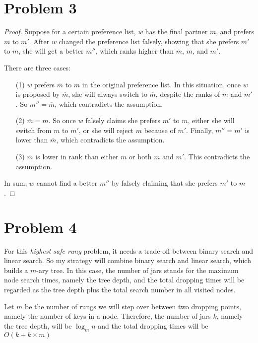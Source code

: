 \documentclass[12pt,letterpaper]{article}
\begin{document}
\section*{Problem 3}
\begin{proof}
Suppose for a certain preference list, $w$ has the final partner $\overline{m}$,
and prefers $m$ to $m'$. After $w$ changed the preference list falsely, 
showing that she prefers $m'$ to $m$, she will get a better $m''$, which 
ranks higher than $\overline{m}$, $m$, and $m'$.

There are three cases:
\begin{itemize}
    \item[(1)] $w$ prefers $\overline{m}$ to $m$ in the original preference 
    list. In this situation, once $w$ is proposed by $\overline{m}$, she will 
    always switch to $\overline{m}$, despite the ranks of $m$ and $m'$. 
    So $m'' = \overline{m}$, which contradicts the assumption. 

    \item[(2)] $\overline{m} = m$. So once $w$ falsely claims she prefers $m'$
    to $m$, either she will switch from $m$ to $m'$, or she will reject $m$ 
    because of $m'$. Finally, $m'' = m'$ is lower than $\overline{m}$, which
    contradicts the assumption.

    \item[(3)] $\overline{m}$ is lower in rank than either $m$ or both $m$ and
    $m'$. This contradicts the assumption.
\end{itemize}

In sum, $w$ cannot find a better $m''$ by falsely claiming that she prefers 
$m'$ to $m$.
\end{proof}

\section*{Problem 4}
For this \textit{highest safe rung} problem, it needs a trade-off between binary
search and linear search. So my strategy will combine binary search and linear
search, which builds a $m$-ary tree. In this case, the number of jars stands 
for the maximum node search times, namely the tree depth, and the total 
dropping times will be regarded as the tree depth plus the total search number 
in all visited nodes. 
 
Let $m$ be the number of rungs we will step over between two dropping points,
namely the number of keys in a node. Therefore, the number of jars $k$, 
namely the tree depth, will be $\log_{m}n$ and the total dropping times will 
be $O(k + k \times m)$
\end{document}
